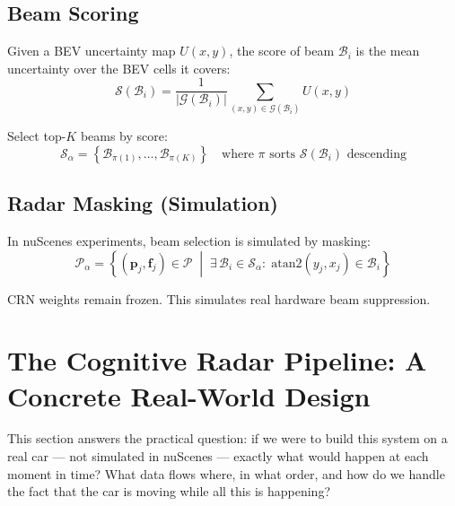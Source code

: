 \documentclass[12pt, a4paper]{article}
\newcommand{\beam}{\mathcal{B}}
\newcommand{\beamset}{\mathcal{S}}
\theoremstyle{definition}
\begin{document}
\subsection{Beam Scoring}

Given a BEV uncertainty map $U(x,y)$, the score of beam $\beam_i$ is the
mean uncertainty over the BEV cells it covers:
\begin{equation}
  \mathcal{S}(\beam_i)
  = \frac{1}{|\mathcal{G}(\beam_i)|}
    \sum_{(x,y)\in\mathcal{G}(\beam_i)} U(x,y)
  \label{eq:beam_score}
\end{equation}

Select top-$K$ beams by score:
\begin{equation}
  \beamset_\alpha
  = \left\{\beam_{\pi(1)},\ldots,\beam_{\pi(K)}\right\}
  \quad\text{where }\pi\text{ sorts }\mathcal{S}(\beam_i)\text{ descending}
  \label{eq:topk}
\end{equation}

\subsection{Radar Masking (Simulation)}

In nuScenes experiments, beam selection is simulated by masking:
\begin{equation}
  \mathcal{P}_\alpha
  = \left\{(\mathbf{p}_j,\mathbf{f}_j)\in\mathcal{P} \;\middle|\;
    \exists\,\beam_i\in\beamset_\alpha:\;
    \mathrm{atan2}(y_j,x_j)\in\beam_i\right\}
  \label{eq:masking}
\end{equation}

CRN weights remain frozen. This simulates real hardware beam suppression.

\section{The Cognitive Radar Pipeline: A Concrete Real-World Design}
\label{sec:pipeline}

\begin{plainbox}
This section answers the practical question: if we were to build this system
on a real car --- not simulated in nuScenes --- exactly what would happen at
each moment in time? What data flows where, in what order, and how do we handle
the fact that the car is moving while all this is happening?
\end{plainbox}
\end{document}
